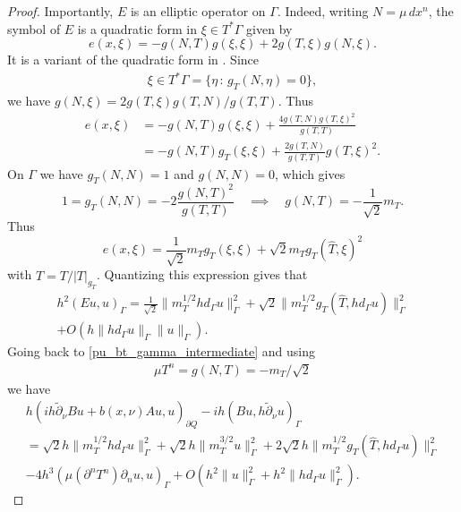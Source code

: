 \documentclass[11pt,letterpaper]{amsart}
\theoremstyle{definition}
\numberwithin{equation}{section}
\newcommand{\norm}[1]{\lVert #1 \rVert}         %
\newcommand{\p}{\partial}
\def\p{\partial}
\begin{document}
\begin{proof}
Importantly, $E$ is an elliptic operator on $\Gamma$. Indeed, writing $N = \mu \,dx^n$, the symbol of $E$ is a quadratic form in $\xi \in T^* \Gamma$ given by 
\[
e(x,\xi) = -g(N, T) g(\xi, \xi) + 2 g(T, \xi) g(N, \xi).
\]
It is a variant of the quadratic form in \cite[Lemma 24.1.2]{hormander}. Since 
    \begin{align*}
\xi \in T^* \Gamma = \{ \eta \,:\, g_T(N,\eta) = 0 \},
    \end{align*}
we have $g(N, \xi) = 2 g(T, \xi) g(T, N) / g(T,T)$. Thus 
\begin{align*}
e(x,\xi) 
&= 
 - g(N, T) g(\xi, \xi) + 
\frac{4 g(T, N) g(T, \xi)^2}{g(T,T)} 
\\
 &= -g(N, T) g_T(\xi,\xi) + \frac{2 g(T, N)}{g(T,T)} g(T, \xi)^2.
\end{align*}
On $\Gamma$ we have $g_T(N,N) = 1$ and $g(N,N) = 0$, which gives 
\[
1 = g_T(N,N) = -2 \frac{g(N,T)^2}{g(T,T)} \quad \implies \quad g(N,T) = -\frac{1}{\sqrt{2}} m_T.
\]
Thus 
\[
e(x,\xi) = \frac{1}{\sqrt{2}} m_T g_T(\xi, \xi) + \sqrt{2} m_T g_T(\hat{T}, \xi)^2
\]
with $\hat{T} = T/|T|_{g_T}$. Quantizing this expression gives that 
\begin{multline*}
h^2 (Eu, u)_{\Gamma} = \frac{1}{\sqrt{2}} \norm{m_T^{1/2} hd_{\Gamma} u}_{\Gamma}^2 + \sqrt{2} \norm{m_T^{1/2} g_T(\hat{T}, hd_{\Gamma} u)}_{\Gamma}^2 \\
 + O(h \norm{hd_{\Gamma} u}_{\Gamma} \norm{u}_{\Gamma}).
\end{multline*}
Going back to \eqref{pu_bt_gamma_intermediate} and using 
    \begin{align*}%
\mu T^n = g(N, T) = -m_T/\sqrt{2}
    \end{align*}
we have 
\begin{multline} \label{pu_bt_gamma_intermediate_second}
h (i h\tilde{\p}_{\nu} Bu + b(x,\nu) Au, u)_{\p Q}  -ih(Bu, h \tilde{\p}_{\nu} u)_{\Gamma} \\
 = \sqrt{2} h \norm{m_T^{1/2} h d_{\Gamma} u}_{\Gamma}^2 + \sqrt{2} h \norm{m_T^{3/2} u}_{\Gamma}^2 + 2 \sqrt{2} h \norm{m_T^{1/2} g_T(\hat{T}, hd_{\Gamma} u)}_{\Gamma}^2  \\
  - 4 h^3 (\mu (\p^n T^n) \p_n u, u)_{\Gamma} + O(h^2  \norm{u}_{\Gamma}^2 + h^2 \norm{hd_{\Gamma} u}_{\Gamma}^2).
\end{multline}


\end{proof}
\end{document}
